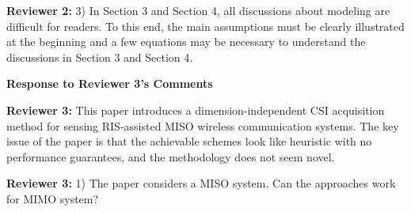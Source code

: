 \documentclass[a4paper,12pt]{article}
\newcommand{\blue}[1]{{\color{blue}{#1}}}
\begin{document}
\textbf{Reviewer 2:}
3) In Section 3 and Section 4, all discussions about modeling are difficult for readers. To this end, the main assumptions must be clearly illustrated at the beginning and a few equations may be necessary to understand the discussions in Section 3 and Section 4.

\blue{
    {\bf Authors:} 
}



{}

\clearpage 




\begin{center}
    {\Large\bf Response to Reviewer 3's Comments}
\end{center}

\textbf{Reviewer 3:}
This paper introduces a dimension-independent CSI acquisition method for sensing
RIS-assisted MISO wireless communication systems. The key issue of the paper is that the achievable schemes look like heuristic with no performance guarantees, and the methodology does not seem novel.

{}

\textbf{Reviewer 3:}
1) The paper considers a MISO system. Can the approaches work for MIMO system?
\end{document}
